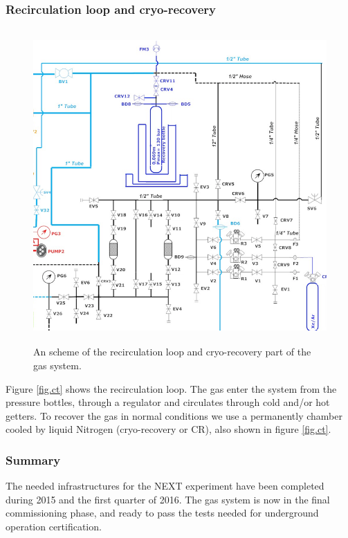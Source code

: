 \subsubsection*{Recirculation loop and cryo-recovery }

\begin{figure}[hpt!]
\centering
\includegraphics[height=12cm]{img/Recirculation.png}
\caption{An scheme of the recirculation loop and cryo-recovery part of the gas system.} \label{fig:ct}
\end{figure}

Figure \ref{fig.ct} shows the recirculation loop. The gas enter the system from the pressure bottles, through a regulator and circulates through cold and/or hot getters. To recover the gas in normal conditions we use a permanently chamber cooled by liquid Nitrogen (cryo-recovery or CR), also shown in figure \ref{fig.ct}. 

\subsubsection*{Summary}
 
The needed infrastructures for the NEXT experiment have been completed during 2015 and the first quarter of 2016. The gas system is now in the final commissioning phase, and ready to pass the tests needed for underground operation certification. 
